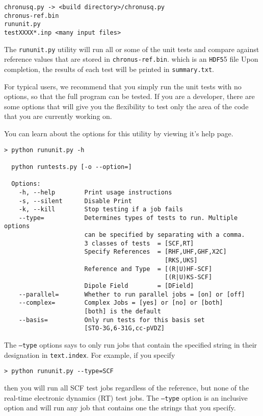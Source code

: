 \documentclass[12pt]{article}
\newcommand{\HDF}{\texttt{HDF5}}
\begin{document}
    \begin{lstlisting}
chronusq.py -> <build directory>/chronusq.py
chronus-ref.bin
rununit.py
testXXXX*.inp <many input files>
    \end{lstlisting}

    \noindent The \texttt{rununit.py} utility will run all or some of the unit tests 
    and compare against reference values that are stored in \texttt{chronus-ref.bin}.
    which is an \HDF5 file Upon completion, the results of each test will be printed 
    in \texttt{summary.txt}. 
    
    For typical users, we recommend that you simply run the unit tests with no options, so that the 
    full program can be tested. If you are a developer, there are some options that will give you the 
    flexibility to test only the area of the code that you are currently working on. 
        
    You can learn about the options for this utility by viewing it's help page. 
    \begin{lstlisting}
> python rununit.py -h

  python runtests.py [-o --option=]

  Options:
    -h, --help        Print usage instructions
    -s, --silent      Disable Print
    -k, --kill        Stop testing if a job fails
    --type=           Determines types of tests to run. Multiple options
                      can be specified by separating with a comma.
                      3 classes of tests  = [SCF,RT] 
                      Specify References  = [RHF,UHF,GHF,X2C]
                                            [RKS,UKS]
                      Reference and Type  = [(R|U)HF-SCF]
                                            [(R|U)KS-SCF] 
                      Dipole Field        = [DField]
    --parallel=       Whether to run parallel jobs = [on] or [off]
    --complex=        Complex Jobs = [yes] or [no] or [both]
                      [both] is the default
    --basis=          Only run tests for this basis set
                      [STO-3G,6-31G,cc-pVDZ]
    \end{lstlisting}
   
   The \texttt{--type} options says to only run jobs that contain the specified string in their 
   designation in \texttt{text.index}. For example, if you specify 
  \begin{lstlisting}
> python rununit.py --type=SCF
   \end{lstlisting}
    \noindent then you will run all SCF test jobs regardless of the reference, but none of the 
    real-time electronic dynamics (RT) test jobs. The \texttt{--type} option is an inclusive option and will run
    any job that contains one the strings that you specify. 
        
\end{document}
